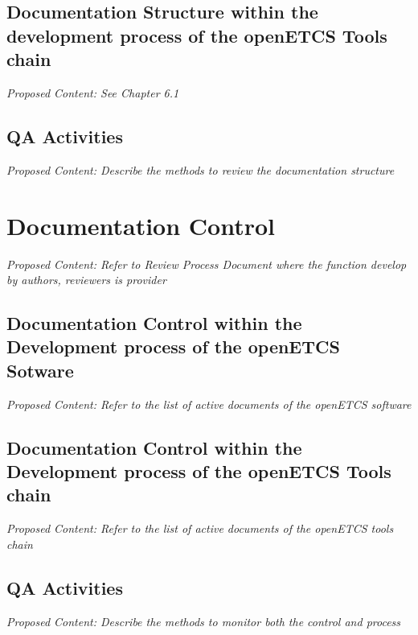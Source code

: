 \documentclass{template/openetcs_article}
\begin{document}
\subsection{Documentation Structure within the development process of the openETCS Tools chain}
\textit{Proposed Content: See Chapter 6.1}

\subsection{QA Activities}
\textit{Proposed Content: Describe the methods to review the documentation structure}


\section{Documentation Control}
\textit{Proposed Content: Refer to Review Process Document where the function develop by authors, reviewers is provider}

\subsection{Documentation Control within the Development process of the openETCS Sotware}
\textit{Proposed Content: Refer to the list of active documents of the openETCS software}

\subsection{Documentation Control within the Development process of the openETCS Tools chain}
\textit{Proposed Content: Refer to the list of active documents of the openETCS tools chain}

\subsection{QA Activities}
\textit{Proposed Content: Describe the methods to monitor both the control and process}
\end{document}
